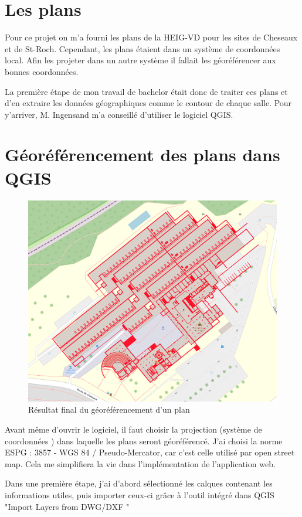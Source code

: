 \documentclass[
    iai, %
    il, %
]{heig-tb}
\begin{document}
\section{Les plans}
Pour ce projet on m'a fourni les plans de la HEIG-VD pour les sites de Cheseaux et de St-Roch.
Cependant, les plans étaient dans un système de coordonnées local.
Afin les projeter dans un autre système il fallait les géoréférencer aux bonnes coordonnées.

La première étape de mon travail de bachelor était donc de traiter ces plans et d'en extraire les données géographiques comme le contour de chaque salle.
Pour y'arriver, M. Ingensand m'a conseillé d'utiliser le logiciel QGIS.

\section{Géoréférencement des plans dans QGIS}
\begin{figure}[H]
    \caption{Résultat final du géoréférencement d'un plan}
    \centering
    \includegraphics{Géoréférencement.png}
\end{figure}

Avant même d'ouvrir le logiciel, il faut choisir la projection (système de coordonnées ) dans laquelle les plans seront géoréférencé.
J'ai choisi la norme ESPG : 3857 - WGS 84 / Pseudo-Mercator, car c'est celle utilisé par open street map.
Cela me simplifiera la vie dans l'implémentation de l'application web.

Dans une première étape, j'ai d'abord sélectionné les calques contenant les informations utiles,
puis importer ceux-ci grâce à l'outil intégré dans QGIS "Import Layers from DWG/DXF "
\end{document}
